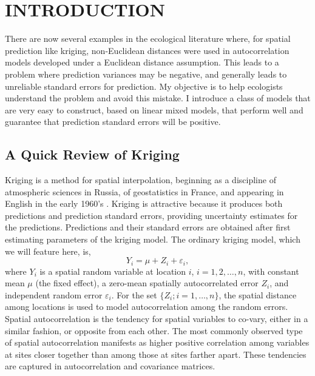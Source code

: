 
\section*{INTRODUCTION}

There are now several examples in the ecological literature where, for spatial prediction like kriging, non-Euclidean distances were used in autocorrelation models developed under a Euclidean distance assumption.  This leads to a problem where prediction variances may be negative, and generally leads to unreliable standard errors for prediction.  My objective is to help ecologists understand the problem and avoid this mistake.  I introduce a class of models that are very easy to construct, based on linear mixed models, that perform well and guarantee that prediction standard errors will be positive.

\subsection*{A Quick Review of Kriging}

Kriging is a method for spatial interpolation, beginning as a discipline of atmospheric sciences in Russia, of geostatistics in France, and appearing in English in the early 1960's \citep{Gand:obje:1963, Math:Prin:1963,Cres:orig:1990}.  Kriging is attractive because it produces both predictions and prediction standard errors, providing uncertainty estimates for the predictions. Predictions and their standard errors are obtained after first estimating parameters of the kriging model.  The ordinary kriging model, which we will feature here, is,
\begin{equation} \label{eq:OKmodel}
    Y_i = \mu + Z_i + \varepsilon_i,
\end{equation}
where $Y_i$ is a spatial random variable at location $i$, $i = 1,2,\ldots,n$, with constant mean $\mu$ (the fixed effect), a zero-mean spatially autocorrelated error $Z_i$, and independent random error $ \varepsilon_i$. For the set $\{Z_i; i = 1,\ldots,n\}$, the spatial distance among locations is used to model autocorrelation among the random errors. Spatial autocorrelation is the tendency for spatial variables to co-vary, either in a similar fashion, or opposite from each other.  The most commonly observed type of spatial autocorrelation manifests as higher positive correlation among variables at sites closer together than among those at sites farther apart.  These tendencies are captured in autocorrelation and covariance matrices. 

